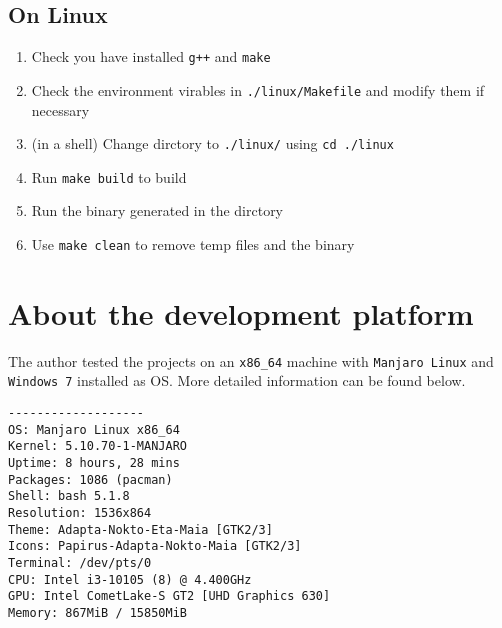 \documentclass[cn,black,12pt,normal]{elegantnote}
\begin{document}
\subsection{On Linux}

\begin{enumerate}
    \item Check you have installed \lstinline{g++} and \lstinline{make}
    \item Check the environment virables in \lstinline{./linux/Makefile} and modify them if necessary
    \item (in a shell) Change dirctory to \lstinline{./linux/} using \lstinline{cd ./linux}
    \item Run \lstinline{make build} to build
    \item Run the binary generated in the dirctory
    \item Use \lstinline{make clean} to remove temp files and the binary
\end{enumerate}

\section{About the development platform}

The author tested the projects on an \lstinline{x86_64} machine with \lstinline{Manjaro Linux} and \lstinline{Windows 7} installed as OS. More detailed information can be found below.

\begin{lstlisting}
-------------------
OS: Manjaro Linux x86_64
Kernel: 5.10.70-1-MANJARO
Uptime: 8 hours, 28 mins
Packages: 1086 (pacman)
Shell: bash 5.1.8
Resolution: 1536x864
Theme: Adapta-Nokto-Eta-Maia [GTK2/3]
Icons: Papirus-Adapta-Nokto-Maia [GTK2/3]
Terminal: /dev/pts/0
CPU: Intel i3-10105 (8) @ 4.400GHz
GPU: Intel CometLake-S GT2 [UHD Graphics 630]
Memory: 867MiB / 15850MiB
\end{lstlisting}


\end{document}
